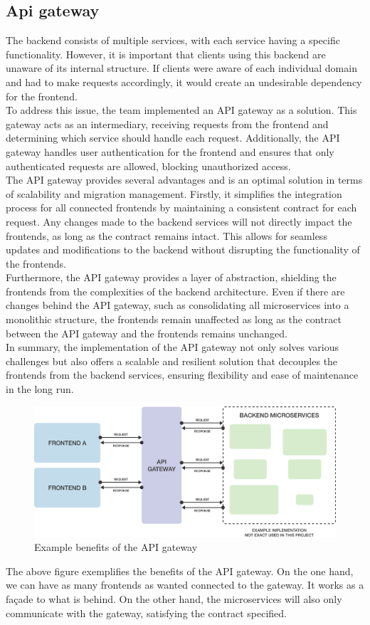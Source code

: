 \documentclass[./chapters/design.tex]{subfiles}
\begin{document}
\subsection{Api gateway}
The backend consists of multiple services, with each service having a specific
functionality. However, it is important that clients using this backend are
unaware of its internal structure. If clients were aware of each individual
domain and had to make requests accordingly, it would create an undesirable
dependency for the frontend.
\\[8pt]
To address this issue, the team implemented an API gateway as a solution. This
gateway acts as an intermediary, receiving requests from the frontend and
determining which service should handle each request. Additionally, the API
gateway handles user authentication for the frontend and ensures that only
authenticated requests are allowed, blocking unauthorized access.
\\[8pt]
The API gateway provides several advantages and is an optimal solution in terms
of scalability and migration management. Firstly, it simplifies the integration
process for all connected frontends by maintaining a consistent contract for
each request. Any changes made to the backend services will not directly impact
the frontends, as long as the contract remains intact. This allows for seamless
updates and modifications to the backend without disrupting the functionality of
the frontends.
\\[8pt]
Furthermore, the API gateway provides a layer of abstraction, shielding the
frontends from the complexities of the backend architecture. Even if there are
changes behind the API gateway, such as consolidating all microservices into a
monolithic structure, the frontends remain unaffected as long as the contract
between the API gateway and the frontends remains unchanged.
\\[8pt]
In summary, the implementation of the API gateway not only solves various
challenges but also offers a scalable and resilient solution that decouples the
frontends from the backend services, ensuring flexibility and ease of
maintenance in the long run.
\begin{figure}[H]
	\centering
	\includegraphics[width=\textwidth]{./assets/api-gateway.png}
	\caption{Example benefits of the API gateway}
\end{figure}
The above figure exemplifies the benefits of the API gateway. On the one hand,
we can have as many frontends as wanted connected to the gateway. It works as a
façade to what is behind. On the other hand, the microservices will also only
communicate with the gateway, satisfying the contract specified.
\end{document}

